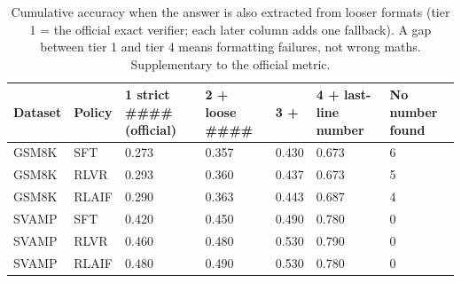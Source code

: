 \begin{table}[t]
\centering
\small
\caption{Cumulative accuracy when the answer is also extracted from looser formats (tier 1 = the official exact verifier; each later column adds one fallback). A gap between tier 1 and tier 4 means formatting failures, not wrong maths. Supplementary to the official metric.}
\begin{tabular}{lllllll}
\toprule
Dataset & Policy & 1 strict #### (official) & 2 + loose #### & 3 + \boxed{} & 4 + last-line number & No number found \\
\midrule
GSM8K & SFT & 0.273 & 0.357 & 0.430 & 0.673 & 6 \\
GSM8K & RLVR & 0.293 & 0.360 & 0.437 & 0.673 & 5 \\
GSM8K & RLAIF & 0.290 & 0.363 & 0.443 & 0.687 & 4 \\
SVAMP & SFT & 0.420 & 0.450 & 0.490 & 0.780 & 0 \\
SVAMP & RLVR & 0.460 & 0.480 & 0.530 & 0.790 & 0 \\
SVAMP & RLAIF & 0.480 & 0.490 & 0.530 & 0.780 & 0 \\
\bottomrule
\end{tabular}
\end{table}
